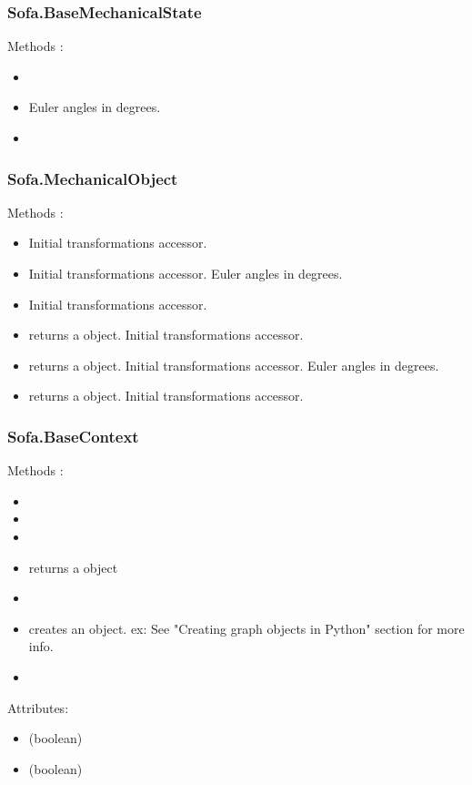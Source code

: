 \subsubsection{Sofa.BaseMechanicalState}
Methods :
\begin{itemize}
\item {}
\item {} Euler angles in degrees.
\item {} 
\end{itemize}

\subsubsection{Sofa.MechanicalObject}
Methods :
\begin{itemize}
\item {} Initial transformations accessor.
\item {} Initial transformations accessor. Euler angles in degrees.
\item {} Initial transformations accessor.
\item {} returns a  object. Initial transformations accessor.
\item {} returns a  object. Initial transformations accessor. Euler angles in degrees.
\item {} returns a  object. Initial transformations accessor.
\end{itemize}

\subsubsection{Sofa.BaseContext}
Methods :
\begin{itemize}
\item {} 
\item {} 
\item {} 
\item {} returns a  object
\item {} 
\item {} creates an object. ex:  See "Creating graph objects in Python" section for more info.
\item {}
\end{itemize}
Attributes:
\begin{itemize}
\item {}  (boolean)
\item {}  (boolean)
\end{itemize}


